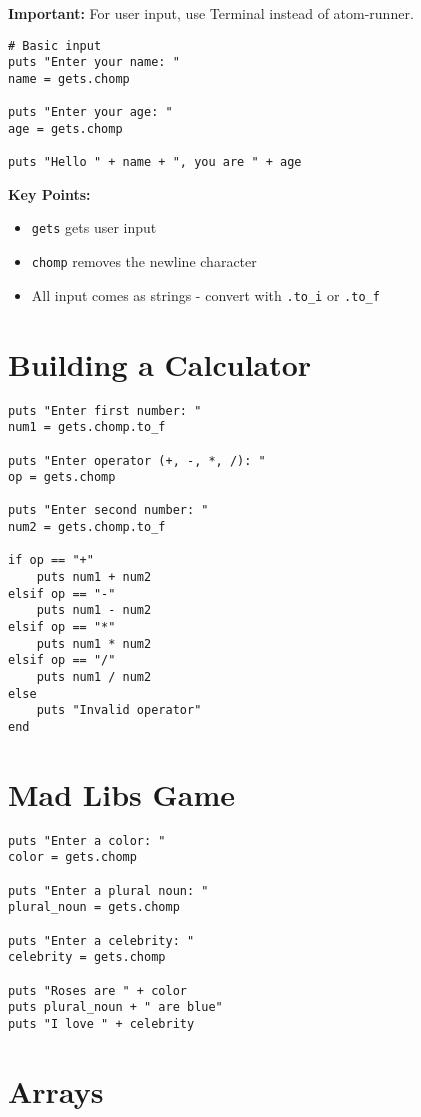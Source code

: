 \documentclass[12pt,a4paper]{article}
\begin{document}
\textbf{Important:} For user input, use Terminal instead of atom-runner.

\begin{lstlisting}
# Basic input
puts "Enter your name: "
name = gets.chomp

puts "Enter your age: "
age = gets.chomp

puts "Hello " + name + ", you are " + age
\end{lstlisting}

\textbf{Key Points:}
\begin{itemize}
    \item \texttt{gets} gets user input
    \item \texttt{chomp} removes the newline character
    \item All input comes as strings - convert with \texttt{.to\_i} or \texttt{.to\_f}
\end{itemize}

\section{Building a Calculator}

\begin{lstlisting}
puts "Enter first number: "
num1 = gets.chomp.to_f

puts "Enter operator (+, -, *, /): "
op = gets.chomp

puts "Enter second number: "
num2 = gets.chomp.to_f

if op == "+"
    puts num1 + num2
elsif op == "-"
    puts num1 - num2
elsif op == "*"
    puts num1 * num2
elsif op == "/"
    puts num1 / num2
else
    puts "Invalid operator"
end
\end{lstlisting}

\section{Mad Libs Game}

\begin{lstlisting}
puts "Enter a color: "
color = gets.chomp

puts "Enter a plural noun: "
plural_noun = gets.chomp

puts "Enter a celebrity: "
celebrity = gets.chomp

puts "Roses are " + color
puts plural_noun + " are blue"
puts "I love " + celebrity
\end{lstlisting}

\section{Arrays}
\end{document}
